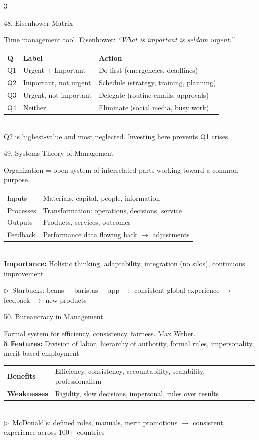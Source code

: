\documentclass[7.5pt, letterpaper]{article}
\newcommand{\concept}[1]{%
  \vspace{2.5pt}%
  \noindent\colorbox{accent}{\parbox{\dimexpr\linewidth-2\fboxsep}{\fontsize{6.8pt}{7.5pt}\selectfont\bfseries\color{white}\strut #1\strut}}%
  \vspace{1pt}\par%
}
\newcommand{\kv}[2]{\noindent\textbf{#1:} #2\par}
\newcommand{\bul}[1]{\noindent$\triangleright$\ #1\par}
\newcommand{\minitab}[1]{%
  \begingroup
  \fontsize{6.2pt}{7pt}\selectfont
  \setlength{\tabcolsep}{2pt}
  #1
  \endgroup
}
\begin{document}
\begin{multicols}{3}
\concept{48. Eisenhower Matrix}
Time management tool. Eisenhower: \textit{``What is important is seldom urgent.''}\\
\minitab{\begin{tabular}{@{}lll@{}}
\textbf{Q} & \textbf{Label} & \textbf{Action}\\
Q1 & Urgent + Important & Do first (emergencies, deadlines)\\
Q2 & Important, not urgent & Schedule (strategy, training, planning)\\
Q3 & Urgent, not important & Delegate (routine emails, approvals)\\
Q4 & Neither & Eliminate (social media, busy work)\\
\end{tabular}}\\
Q2 is highest-value and most neglected. Investing here prevents Q1 crises.

\concept{49. Systems Theory of Management}
Organization = open system of interrelated parts working toward a common purpose.\\
\minitab{\begin{tabular}{@{}ll@{}}
Inputs & Materials, capital, people, information\\
Processes & Transformation: operations, decisions, service\\
Outputs & Products, services, outcomes\\
Feedback & Performance data flowing back $\to$ adjustments\\
\end{tabular}}\\
\kv{Importance}{Holistic thinking, adaptability, integration (no silos), continuous improvement}
\bul{Starbucks: beans + baristas + app $\to$ consistent global experience $\to$ feedback $\to$ new products}

\concept{50. Bureaucracy in Management}
Formal system for efficiency, consistency, fairness. Max Weber.\\
\kv{5 Features}{Division of labor, hierarchy of authority, formal rules, impersonality, merit-based employment}
\minitab{\begin{tabular}{@{}ll@{}}
\textbf{Benefits} & Efficiency, consistency, accountability, scalability, professionalism\\
\textbf{Weaknesses} & Rigidity, slow decisions, impersonal, rules over results\\
\end{tabular}}\\
\bul{McDonald's: defined roles, manuals, merit promotions $\to$ consistent experience across 100+ countries}


\end{multicols}
\end{document}
